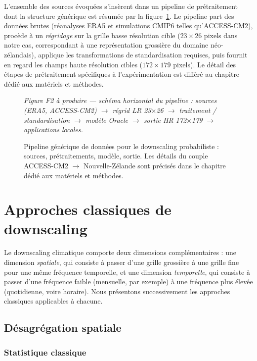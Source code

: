 \documentclass[14pt,a4paper,openany]{extreport}
\theoremstyle{definition}
\newcommand{\figplaceholder}[2][0.9\linewidth]{%
  \begin{tcolorbox}[width=#1,height=5cm,valign=center,colback=gray!8,colframe=gray!45,arc=2pt,boxrule=0.5pt]
    \centering\small\textit{#2}
  \end{tcolorbox}%
}
\begin{document}
L'ensemble des sources évoquées s'insèrent dans un pipeline de prétraitement dont la structure générique est résumée par la figure~\ref{fig:pipeline}. Le pipeline part des données brutes (réanalyses ERA5 et simulations CMIP6 telles qu'ACCESS-CM2), procède à un \emph{régridage} sur la grille basse résolution cible ($23 \times 26$ pixels dans notre cas, correspondant à une représentation grossière du domaine néo-zélandais), applique les transformations de standardisation requises, puis fournit en regard les champs haute résolution cibles ($172 \times 179$ pixels). Le détail des étapes de prétraitement spécifiques à l'expérimentation est différé au chapitre dédié aux matériels et méthodes.

\begin{figure}[ht]
  \centering
  \figplaceholder{Figure F2 à produire --- schéma horizontal du pipeline : sources (ERA5, ACCESS-CM2) $\to$ régrid LR 23$\times$26 $\to$ traitement / standardisation $\to$ modèle Oracle $\to$ sortie HR 172$\times$179 $\to$ applications locales.}
  \caption{Pipeline générique de données pour le downscaling probabiliste : sources, prétraitements, modèle, sortie. Les détails du couple ACCESS-CM2 $\to$ Nouvelle-Zélande sont précisés dans le chapitre dédié aux matériels et méthodes.}
  \label{fig:pipeline}
\end{figure}

\section{Approches classiques de downscaling}
\label{sec:classiques}

Le downscaling climatique comporte deux dimensions complémentaires : une dimension \emph{spatiale}, qui consiste à passer d'une grille grossière à une grille fine pour une même fréquence temporelle, et une dimension \emph{temporelle}, qui consiste à passer d'une fréquence faible (mensuelle, par exemple) à une fréquence plus élevée (quotidienne, voire horaire). Nous présentons successivement les approches classiques applicables à chacune.

\subsection{Désagrégation spatiale}
\label{ssec:disagg-spatiale}

\subsubsection{Statistique classique}
\end{document}
